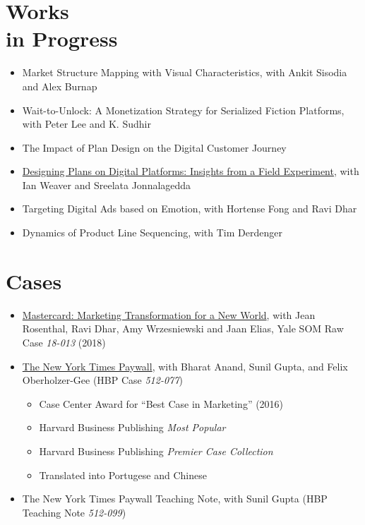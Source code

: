 \documentclass[margin, line, centered, 10pt]{res}
\begin{document}
\begin{resume}
\section{\sc Works \\ in Progress}%
\begin{itemize}
\item Market Structure Mapping with Visual Characteristics, with Ankit Sisodia and Alex Burnap
\item Wait-to-Unlock: A Monetization Strategy for Serialized Fiction Platforms, with Peter Lee and K. Sudhir
\item The Impact of Plan Design on the Digital Customer Journey
\item \href{}{Designing Plans on Digital Platforms: Insights from a Field Experiment}, with Ian Weaver and Sreelata Jonnalagedda
\item Targeting Digital Ads based on Emotion, with Hortense Fong and Ravi Dhar
\item Dynamics of Product Line Sequencing, with Tim Derdenger
\end{itemize}

\section{\sc Cases}%
\begin{itemize}
\item \href{http://vol11.cases.som.yale.edu/mastercard}{Mastercard: Marketing Transformation for a New World}, with Jean Rosenthal, Ravi Dhar,  Amy Wrzesniewski  and Jaan Elias, Yale SOM Raw Case 
\textit{18-013} (2018)

\item \href{https://www.thecasecentre.org/educators/ordering/selecting/featuredcases/paywall}{The New York Times Paywall}, with Bharat Anand, Sunil Gupta, and Felix Oberholzer-Gee (HBP Case \textit{512-077})
\begin{itemize}
\item Case Center Award for ``Best Case in Marketing'' (2016)
\item Harvard Business Publishing \textit{Most Popular}
\item Harvard Business Publishing \textit{Premier Case Collection}
\item Translated into Portugese and Chinese
\end{itemize}\item The New York Times Paywall Teaching Note, with Sunil Gupta (HBP Teaching Note \textit{512-099})


\end{itemize}
\end{resume}
\end{document}
